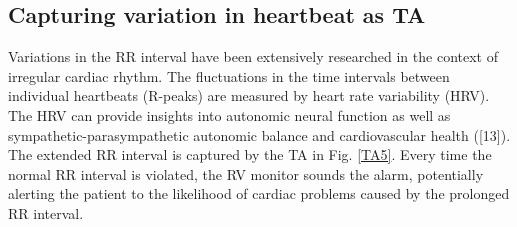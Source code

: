\subsection{Capturing variation in heartbeat as TA}

Variations in the RR interval have been extensively researched
in the context of irregular cardiac rhythm. The fluctuations in the
time intervals between individual heartbeats (R-peaks) are measured
by heart rate variability (HRV). The HRV can provide insights into
autonomic neural function as well as sympathetic-parasympathetic
autonomic balance and cardiovascular health ([13]). The extended
RR interval is captured by the TA in Fig. \ref{TA5}. Every time the normal
RR interval is violated, the RV monitor sounds the alarm, potentially
alerting the patient to the likelihood of cardiac problems caused by
the prolonged RR interval.


